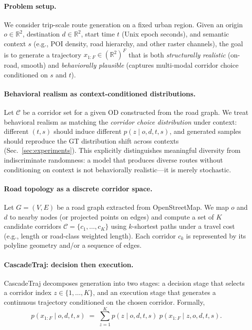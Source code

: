 \label{sec:method}

\paragraph{Problem setup.}
We consider trip-scale route generation on a fixed urban region.
Given an origin $o\in\mathbb{R}^2$, destination $d\in\mathbb{R}^2$, start time $t$ (Unix epoch seconds), and semantic context $s$ (e.g., POI density, road hierarchy, and other raster channels), the goal is to generate a trajectory
$x_{1:F}\in(\mathbb{R}^2)^F$ that is both \emph{structurally realistic} (on-road, smooth) and \emph{behaviorally plausible} (captures multi-modal corridor choice conditioned on $s$ and $t$).

\paragraph{Behavioral realism as context-conditioned distributions.}
Let $\mathcal{C}$ be a corridor set for a given OD constructed from the road graph.
We treat behavioral realism as matching the \emph{corridor choice distribution} under context:
different $(t,s)$ should induce different $p(z\mid o,d,t,s)$, and generated samples should reproduce the GT distribution shift across contexts (Sec.~\ref{sec:experiments}).
This explicitly distinguishes meaningful diversity from indiscriminate randomness: a model that produces diverse routes without conditioning on context is not behaviorally realistic---it is merely stochastic.

\paragraph{Road topology as a discrete corridor space.}
Let $G=(V,E)$ be a road graph extracted from OpenStreetMap.
We map $o$ and $d$ to nearby nodes (or projected points on edges) and compute a set of $K$ candidate corridors $\mathcal{C}=\{c_1,\dots,c_K\}$ using $k$-shortest paths under a travel cost (e.g., length or road-class weighted length).
Each corridor $c_k$ is represented by its polyline geometry and/or a sequence of edges.

\paragraph{CascadeTraj: decision then execution.}
CascadeTraj decomposes generation into two stages:
a decision stage that selects a corridor index $z\in\{1,\dots,K\}$,
and an execution stage that generates a continuous trajectory conditioned on the chosen corridor.
Formally,
\[
  p(x_{1:F}\mid o,d,t,s)\;=\;\sum_{z=1}^K p(z\mid o,d,t,s)\;p(x_{1:F}\mid z,o,d,t,s).
\]

